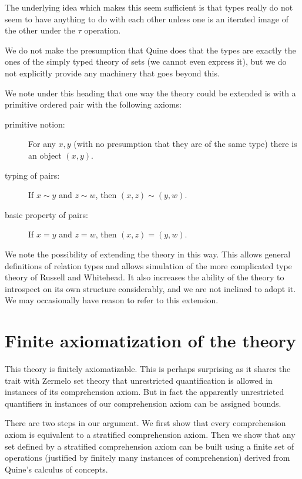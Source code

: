 \documentclass[12pt]{article}
\begin{document}
\begin{description}
The underlying idea which makes this seem sufficient is that types really do not seem to have anything to do with each other unless one is an iterated image of the other under the $\tau$ operation.

We do not make the presumption that Quine does that the types are exactly the ones of the simply typed theory of sets (we cannot even express it), but we do not explicitly provide any machinery that goes beyond this.

We note under this heading that one way the theory could be extended is with a primitive ordered pair with the following axioms:

\begin{description}

\item[primitive notion:]  For any $x,y$ (with no presumption that they are of the same type) there is an object $(x,y)$.

\item[typing of pairs:]  If $x \sim y$ and $z \sim w$, then $(x,z) \sim (y,w)$.

\item[basic property of pairs:]  If $x=y$ and $z=w$, then $(x,z)=(y,w)$.

\end{description}

We note the possibility of extending the theory in this way.  This allows general definitions of relation types and allows simulation of the more complicated type theory of Russell and Whitehead.  It also increases the ability
of the theory to introspect on its own structure considerably, and we are not inclined to adopt it.  We may occasionally have reason to refer to this extension.

\end{description}

\section{Finite axiomatization of the theory}

This theory is finitely axiomatizable.  This is perhaps surprising as it shares the trait with Zermelo set theory that unrestricted quantification is allowed in instances of its comprehension axiom.  But in fact the apparently unrestricted quantifiers in instances of our comprehension axiom can be assigned bounds.

There are two steps in our argument.  We first show that every comprehension axiom is equivalent to a stratified comprehension axiom.  Then we show that any set defined by a stratified comprehension axiom can be built using a finite set of operations (justified by finitely many instances of comprehension) derived from Quine's calculus of concepts.
\end{document}
